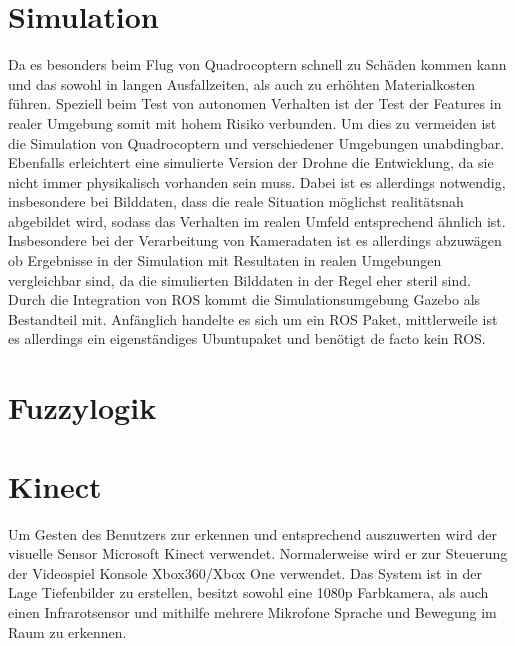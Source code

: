 

\section{Simulation}
Da es besonders beim Flug von Quadrocoptern schnell zu Schäden kommen kann und das sowohl  in langen Ausfallzeiten, als auch zu erhöhten Materialkosten führen. Speziell beim Test von autonomen Verhalten ist der Test der Features in realer Umgebung somit mit hohem Risiko verbunden. Um dies zu vermeiden ist die Simulation von Quadrocoptern und verschiedener Umgebungen unabdingbar. Ebenfalls erleichtert eine simulierte Version der Drohne die Entwicklung, da sie nicht immer physikalisch vorhanden sein muss. Dabei ist es allerdings notwendig, insbesondere
bei Bilddaten, dass die reale Situation möglichst realitätsnah abgebildet wird, sodass
das Verhalten im realen Umfeld entsprechend ähnlich ist. Insbesondere bei der
Verarbeitung von Kameradaten ist es allerdings abzuwägen ob Ergebnisse in der Simulation
mit Resultaten in realen Umgebungen vergleichbar sind, da die simulierten
Bilddaten in der Regel eher steril sind.\newline
Durch die Integration von ROS kommt die Simulationsumgebung Gazebo als Bestandteil
mit. Anfänglich handelte es sich um ein ROS Paket, mittlerweile ist es allerdings
ein eigenständiges Ubuntupaket und benötigt de facto kein ROS. 


\section{Fuzzylogik}


\section{Kinect}
Um Gesten des Benutzers zur erkennen und entsprechend auszuwerten wird der visuelle Sensor Microsoft Kinect verwendet. Normalerweise wird er zur Steuerung der Videospiel Konsole Xbox360/Xbox One verwendet. Das System ist in der Lage Tiefenbilder zu erstellen, besitzt sowohl eine 1080p Farbkamera, als auch einen Infrarotsensor und mithilfe mehrere Mikrofone Sprache und Bewegung im Raum zu erkennen. 
